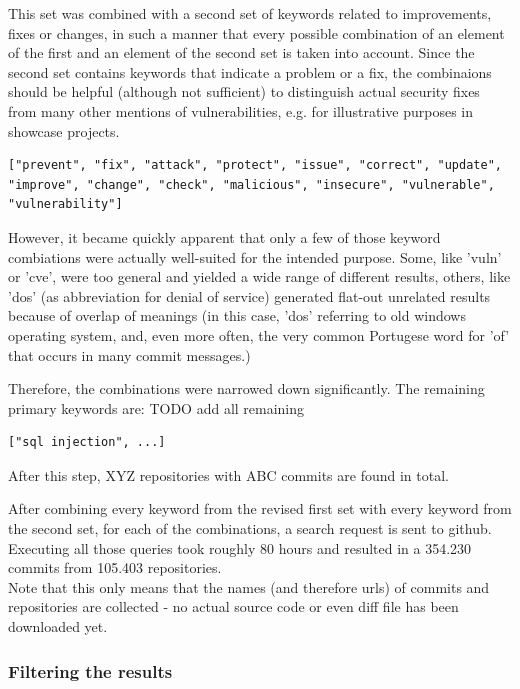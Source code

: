 \documentclass[
	a4paper,
	pagesize,
	pdftex,
	12pt,
	twoside, %
	BCOR=5mm, %
	ngerman,
	fleqn,
	final,
	]{scrartcl}
\begin{document}
This set was combined with a second set of keywords related to improvements, fixes or changes, in such a manner that every possible combination of an element of the first and an element of the second set is taken into account. Since the second set contains keywords that indicate a problem or a fix, the combinaions should be helpful (although not sufficient) to distinguish actual security fixes from many other mentions of vulnerabilities, e.g. for illustrative purposes in showcase projects.
\begin{lstlisting}
["prevent", "fix", "attack", "protect", "issue", "correct", "update", "improve", "change", "check", "malicious", "insecure", "vulnerable", "vulnerability"]
\end{lstlisting}
However, it became quickly apparent that only a few of those keyword combiations were actually well-suited for the intended purpose. Some, like 'vuln' or 'cve', were too general and yielded a wide range of different results, others, like 'dos' (as abbreviation for denial of service) generated flat-out unrelated results because of overlap of meanings (in this case, 'dos' referring to old windows operating system, and, even more often, the very common Portugese word for 'of' that occurs in many commit messages.)

Therefore, the combinations were narrowed down significantly. The remaining primary keywords are:
TODO add all remaining %
\begin{lstlisting}
["sql injection", ...]
\end{lstlisting}
After this step, XYZ repositories with ABC commits are found in total.

After combining every keyword from the revised first set with every keyword from the second set, for each of the combinations, a search request is sent to github. Executing all those queries took roughly 80 hours and resulted in a 354.230 commits from 105.403 repositories.\\
Note that this only means that the names (and therefore urls) of commits and repositories are collected - no actual source code or even diff file has been downloaded yet.

\subsubsection{Filtering the results}
\end{document}
